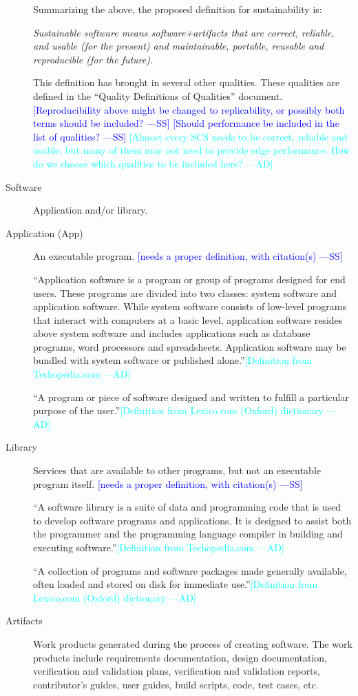 \documentclass[12pt]{article}
\newcommand{\authornote}[3]{\textcolor{#1}{[#3 ---#2]}}
\newcommand{\authornote}[3]{}
\newcommand{\wss}[1]{\authornote{blue}{SS}{#1}} %
\newcommand{\ad}[1]{\authornote{cyan}{AD}{#1}} %
\begin{document}
\begin{description}
  Summarizing the above, the proposed definition for sustainability is:

  \emph{Sustainable software means software+artifacts that are correct,
    reliable, and usable (for the present) and maintainable, portable, reusable
    and reproducible (for the future).}

This definition has brought in several other qualities.  These qualities are
defined in the ``Quality  Definitions of Qualities'' document.
\wss{Reproducibility above might be changed to replicability, or possibly both
  terms should be included?}
\wss{Should performance be included in the list of qualities?}
\ad{Almost every SCS needs to be correct, reliable and usable, but many of them
may not need to provide edge performance. How do we choose which qualities to be
included here?}

\item[Software] Application and/or library.
\item[Application (App)] An executable program. \wss{needs a
    proper definition, with citation(s)}

``Application software is a program or group of programs designed for end users.
These programs are divided into two classes: system software and application
software. While system software consists of low-level programs that interact
with computers at a basic level, application software resides above system
software and includes applications such as database programs, word processors
and spreadsheets. Application software may be bundled with system software or
published alone.''\citep{TechopediaApplication2018}\ad{Definition from
Techopedia.com}

``A program or piece of software designed and written to fulfill a particular
purpose of the user.''\citep{OxfordApplication2020}\ad{Definition from
Lexico.com (Oxford) dictionary}

\item[Library] Services that are available to other programs, but not an
  executable program itself. \wss{needs a
    proper definition, with citation(s)}

``A software library is a suite of data and programming code that is used to
develop software programs and applications. It is designed to assist both the
programmer and the programming language compiler in building and executing
software.''\citep{TechopediaLibrary2016}\ad{Definition from Techopedia.com}

``A collection of programs and software packages made generally available, often
loaded and stored on disk for immediate
use.''\citep{OxfordLibrary2020}\ad{Definition from Lexico.com (Oxford)
dictionary}

\item[Artifacts] Work products generated during the process of creating
  software.  The work products include requirements documentation, design
  documentation, verification and validation plans, verification and validation
  reports, contributor's guides, user guides, build scripts, code, test cases,
  etc.
\end{description}
\end{document}
